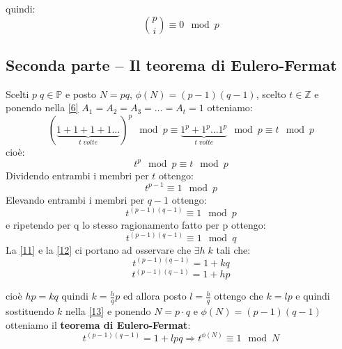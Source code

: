 \documentclass[14pt,a4paper]{article}
\begin{document}
	
	quindi:
	\begin{equation*}
		\binom{p}{i}\equiv 0 \mod p
	\end{equation*}
	
	\subsection{Seconda parte -- Il teorema di Eulero-Fermat}
	Scelti $ p\; q \in \mathbb{P} $ e posto $ N=p q $,  $ \phi(N)=(p-1) (q-1) $, scelto $ t\in \mathbb{Z} $
	e  ponendo nella \eqref{6} $ A_1=A_2=A_3=\dots =A_t=1 $ otteniamo:
	\[ (\underbrace{1+1+1+1\dots}_{t\;volte})^p \mod p \equiv \underbrace{1^p+1^p\dots 1^p}_{t\; volte} \mod p \equiv t \mod p \]
	cioè:
	\begin{equation*}
		t^p \mod p \equiv t \mod p
	\end{equation*}	
	Dividendo entrambi i membri  per $ t $ ottengo:
	\begin{equation}\label{10}
		\boxed{t^{p-1}\equiv1 \mod p}
	\end{equation}
	Elevando entrambi i membri per $ q-1 $ ottengo:
	\begin{equation}\label{11}
		t^{(p-1)(q-1)}\equiv1 \mod p
	\end{equation}
	e ripetendo per q lo stesso ragionamento fatto per p ottengo:
	\begin{equation}\label{12}
		t^{(p-1)(q-1)}\equiv1 \mod q
	\end{equation}
	La \eqref{11} e la \eqref{12} ci portano ad osservare che $ \exists h\;k $ tali che:
	\begin{equation}\label{13}
		t^{(p-1)(q-1)}=1+kq
	\end{equation}
	\begin{equation}
		t^{(p-1)(q-1)}=1+hp
	\end{equation}
	
	
	cioè $ hp=kq $ quindi $ k=\frac{h}{q}p $ ed allora posto $ l=\frac{h}{q}  $ ottengo che $ k=lp $ e quindi sostituendo $ k $ nella \eqref{13} e ponendo $ N=p \cdot q $ e $ \phi(N)=(p-1)(q-1) $ otteniamo il \textbf{teorema di Eulero-Fermat}:
	\begin{equation}\label{15}
		t^{(p-1)(q-1)}=1+lpq\Longrightarrow \boxed{t^{\phi(
				N)}\equiv 1 \mod N}	
	\end{equation}\
	
	
	
	
\end{document}
